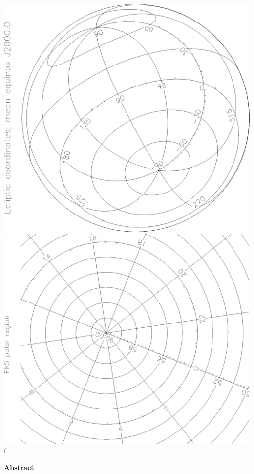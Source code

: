 \documentclass[twoside,11pt]{article}
\newenvironment{latexonly}{}{}
\begin{document}
\begin{latexonly}
\begin{center}
   \includegraphics[scale=0.25,angle=-90]{sun210_figures/frontb_bw.eps}\hfill
   \includegraphics[scale=0.25,angle=-90]{sun210_figures/frontc_bw.eps}\hfill
f-
   \mbox{}
   \end{center}

   \begin{center}
      {\Large\bf Abstract}
   \end{center}
\end{latexonly}
\end{document}

